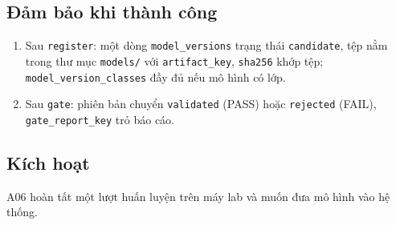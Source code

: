 \subsection{Đảm bảo khi thành công}
\begin{enumerate}
\item Sau {\small\texttt{register}}: một dòng {\small\texttt{model\_\allowbreak{}\allowbreak{}versions}} trạng thái {\small\texttt{candidate}}, tệp nằm trong thư mục {\small\texttt{models/\allowbreak{}\allowbreak{}}} với {\small\texttt{artifact\_\allowbreak{}\allowbreak{}key}}, {\small\texttt{sha256}} khớp tệp; {\small\texttt{model\_\allowbreak{}\allowbreak{}version\_\allowbreak{}\allowbreak{}classes}} đầy đủ nếu mô hình có lớp.
\item Sau {\small\texttt{gate}}: phiên bản chuyển {\small\texttt{validated}} (PASS) hoặc {\small\texttt{rejected}} (FAIL), {\small\texttt{gate\_\allowbreak{}\allowbreak{}report\_\allowbreak{}\allowbreak{}key}} trỏ báo cáo.
\end{enumerate}
\subsection{Kích hoạt}
A06 hoàn tất một lượt huấn luyện trên máy lab và muốn đưa mô hình vào hệ thống.

